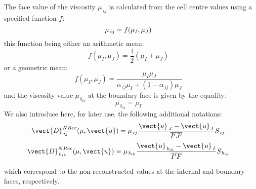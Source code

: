 The face value of the viscosity $\mu_{\,ij}$ is calculated from the cell centre
values using a specified function $f$:
\begin{equation}\notag
\mu_{\,ij} = f(\mu_I,\mu_J)
\end{equation}
this function being either an arithmetic mean:
\begin{equation}
f(\mu_I,\mu_J)= \frac{1}{2}(\mu_I+\mu_J)
\end{equation}
or a geometric mean:
\begin{equation}
f(\mu_I,\mu_J) =\displaystyle \frac{\mu_I \mu_J}{\alpha_{\,ij}
\mu_I+(1-\alpha_{\,ij}) \mu_J}
\end{equation}
and the viscosity value  $\mu_{\,b_{ik}}$ at the boundary face is given by the equality:
\begin{equation}
\mu_{\,b_{ik}}=\mu_I
\end{equation}
We also introduce here, for later use, the following additional notations:
\begin{equation}
\vect{D}^{NRec}_{\,ij}(\mu, \vect{u}) = \mu_{\,ij}
\frac{\vect{u}_{\,J}-\vect{u}_{\,I}}{\overline{I'J'}} S_{\,ij}
\end{equation}
\begin{equation}
\vect{D}^{NRec}_{\,b_{ik}}(\mu, \vect{u}) = \mu_{\,b_{ik}}
\frac{\vect{u}_{\,b_{ik}}-\vect{u}_{\,I}}{\overline{I'F}} S_{\,b_{ik}}
\end{equation}

which correspond to the non-reconstructed values at the internal and boundary
faces, respectively.

